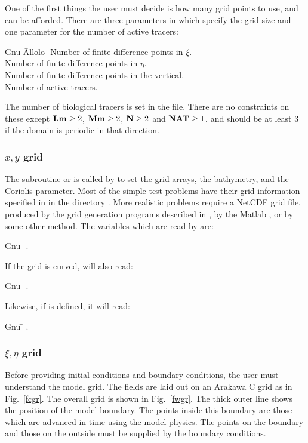 One of the first things the user must decide is how many grid points
to use, and can be afforded.  There are three parameters in
 which specify the grid size and one parameter for the
number of active tracers:
\begin{tabbing}
  Gnu \= Allolo \= \kill
  \>  \> Number of finite-difference points in $\xi$. \\
  \>  \> Number of finite-difference points in $\eta$. \\
  \>  \> Number of finite-difference points in the vertical. \\
  \>  \> Number of active tracers. \\
\end{tabbing}
The number of biological tracers is set in the  file.
There are no constraints on these except $\mbox{\bf Lm} \geq 2$, $\mbox{\bf Mm}
\geq 2$, $\mbox{\bf N} \geq 2$ and $\mbox{\bf NAT} \geq 1$.   and
 should be at least 3 if the domain is periodic in that
direction.

\subsubsection{$x,y$ grid}
The subroutine  or  is called by
 to set the grid arrays, the bathymetry, and the
Coriolis parameter.  Most of the simple test problems have their grid
information specified in  in the directory
.  More realistic problems require a NetCDF grid
file, produced by the grid generation programs described in
\cite{GRIDS}, by the Matlab , or by some
other method.  The variables which are read by  are:
\begin{tabbing}
  Gnu \= \kill
  \> .
\end{tabbing}
If the grid is curved,  will also read:
\begin{tabbing}
  Gnu \= \kill
  \> .
\end{tabbing}
Likewise, if  is defined, it will read:
\begin{tabbing}
  Gnu \= \kill
  \> .
\end{tabbing}

\subsubsection {$\xi,\eta$ grid}
Before providing initial conditions and boundary conditions, the
user must understand the model grid. The fields are laid out on an
Arakawa C grid as in Fig.\ \ref{fcgr}. The overall grid is shown in
Fig.\ \ref{fwgr}.  The thick outer line shows the position of the
model boundary. The points inside this boundary are those which are
advanced in time using the model physics. The points on the boundary
and those on the outside must be supplied by the boundary
conditions.

